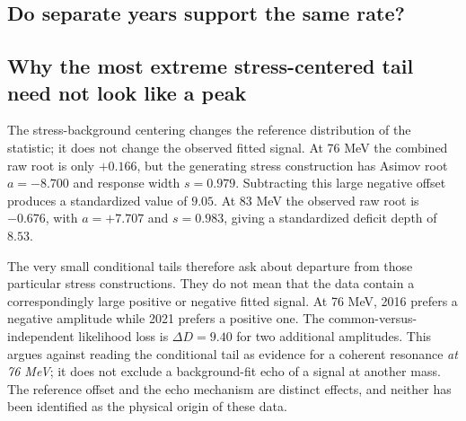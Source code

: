 \clearpage
\begin{landscape}
\subsection*{Do separate years support the same rate?}

\end{landscape}

\clearpage
\subsection*{Why the most extreme stress-centered tail need not look like a peak}
The stress-background centering changes the reference distribution of the statistic; it does not change the observed fitted signal. At 76 MeV the combined raw root is only $+0.166$, but the generating stress construction has Asimov root $a=-8.700$ and response width $s=0.979$. Subtracting this large negative offset produces a standardized value of $9.05$. At 83 MeV the observed raw root is $-0.676$, with $a=+7.707$ and $s=0.983$, giving a standardized deficit depth of $8.53$.

The very small conditional tails therefore ask about departure from those particular stress constructions. They do not mean that the data contain a correspondingly large positive or negative fitted signal. At 76 MeV, 2016 prefers a negative amplitude while 2021 prefers a positive one. The common-versus-independent likelihood loss is $\Delta D=9.40$ for two additional amplitudes. This argues against reading the conditional tail as evidence for a coherent resonance \emph{at 76 MeV}; it does not exclude a background-fit echo of a signal at another mass. The reference offset and the echo mechanism are distinct effects, and neither has been identified as the physical origin of these data.


